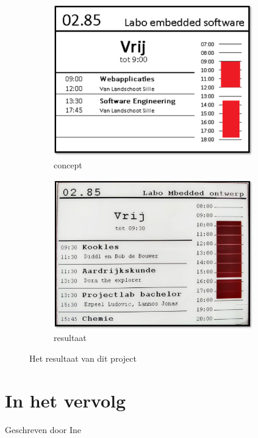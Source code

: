 \documentclass[a4paper,kul]{kulakarticle} %
\begin{document}
\begin{figure}[h]
	\centering
	\begin{subfigure}{0.45\textwidth}
		\centering
		\includegraphics[width=0.95\textwidth]{concept}
		\caption{concept}
		\label{fig:concept}
	\end{subfigure}
	\begin{subfigure}{0.45\textwidth}
		\centering
		\includegraphics[width=0.95\textwidth]{resultaat}
		\caption{resultaat}
		\label{fig:result}
	\end{subfigure}
	\label{fig:res}
	\caption{Het resultaat van dit project}
\end{figure}

\newpage

\section{In het vervolg}
{\scriptsize Geschreven door Ine}
\newline
\end{document}
